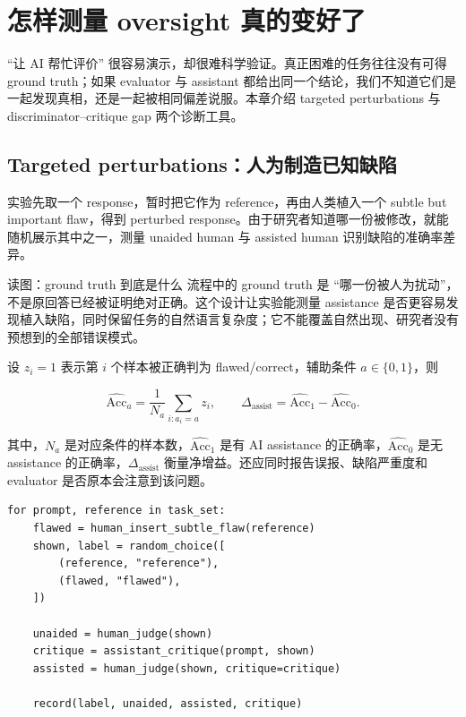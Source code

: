 \section{怎样测量 oversight 真的变好了}

``让 AI 帮忙评价'' 很容易演示，却很难科学验证。真正困难的任务往往没有可得 ground truth；如果 evaluator 与 assistant 都给出同一个结论，我们不知道它们是一起发现真相，还是一起被相同偏差说服。本章介绍 targeted perturbations 与 discriminator--critique gap 两个诊断工具。

\subsection{Targeted perturbations：人为制造已知缺陷}

实验先取一个 response，暂时把它作为 reference，再由人类植入一个 subtle but important flaw，得到 perturbed response。由于研究者知道哪一份被修改，就能随机展示其中之一，测量 unaided human 与 assisted human 识别缺陷的准确率差异。


\begin{knowledgebox}{读图：ground truth 到底是什么}
流程中的 ground truth 是 ``哪一份被人为扰动''，不是原回答已经被证明绝对正确。这个设计让实验能测量 assistance 是否更容易发现植入缺陷，同时保留任务的自然语言复杂度；它不能覆盖自然出现、研究者没有预想到的全部错误模式。
\end{knowledgebox}

设 $z_i=1$ 表示第 $i$ 个样本被正确判为 flawed/correct，辅助条件 $a\in\{0,1\}$，则

\[
\widehat{\mathrm{Acc}}_a=\frac{1}{N_a}\sum_{i:a_i=a} z_i,
\qquad
\Delta_{\mathrm{assist}}=\widehat{\mathrm{Acc}}_1-\widehat{\mathrm{Acc}}_0.
\]

其中，$N_a$ 是对应条件的样本数，$\widehat{\mathrm{Acc}}_1$ 是有 AI assistance 的正确率，$\widehat{\mathrm{Acc}}_0$ 是无 assistance 的正确率，$\Delta_{\mathrm{assist}}$ 衡量净增益。还应同时报告误报、缺陷严重度和 evaluator 是否原本会注意到该问题。

\begin{lstlisting}[caption={Targeted perturbation 评测的最小伪代码}]
for prompt, reference in task_set:
    flawed = human_insert_subtle_flaw(reference)
    shown, label = random_choice([
        (reference, "reference"),
        (flawed, "flawed"),
    ])

    unaided = human_judge(shown)
    critique = assistant_critique(prompt, shown)
    assisted = human_judge(shown, critique=critique)

    record(label, unaided, assisted, critique)
\end{lstlisting}

